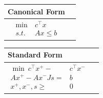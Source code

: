 \documentclass[11pt]{article}
\numberwithin{equation}{section}
\begin{document}
\begin{table}[!htb]
    \begin{minipage}[t]{.5\linewidth}
        \vspace{0pt}
        \centering
        \begin{tabular}{ll}
            Canonical Form \\ \hline
            \parbox{5cm}{\begin{align*}
                \min \ & c^\top x \\
                s.t. \ & Ax\leq b
            \end{align*}}
        \end{tabular}
    \end{minipage}%
    \begin{minipage}[t]{.5\linewidth}
        \vspace{0pt}
        \centering
        \begin{tabular}{ll}
            Standard Form \\ \hline
            \parbox{5cm}{\begin{align*}
                \min \  c^\top x^+ - & c^\top x^- \\
                Ax^+ - Ax^- Js =& b \\
                x^{+}, x^-, s \geqslant& 0
            \end{align*}}
        \end{tabular}
    \end{minipage} 
\end{table}
\end{document}
